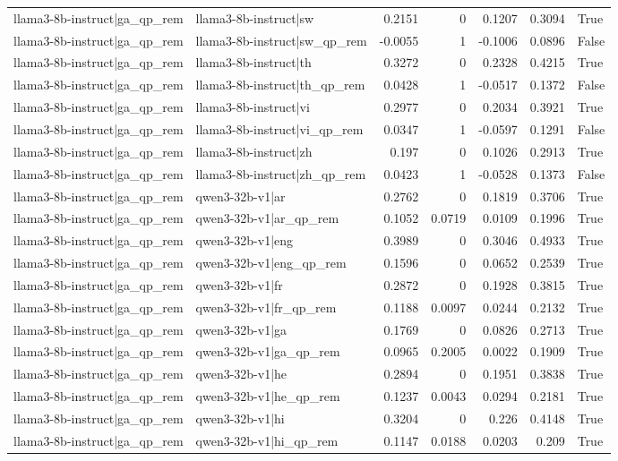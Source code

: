 \begin{table}
\begin{tabular}{l l r r r r l}
llama3-8b-instruct|ga_qp_rem & llama3-8b-instruct|sw & 0.2151 & 0 & 0.1207 & 0.3094 & True \\
llama3-8b-instruct|ga_qp_rem & llama3-8b-instruct|sw_qp_rem & -0.0055 & 1 & -0.1006 & 0.0896 & False \\
llama3-8b-instruct|ga_qp_rem & llama3-8b-instruct|th & 0.3272 & 0 & 0.2328 & 0.4215 & True \\
llama3-8b-instruct|ga_qp_rem & llama3-8b-instruct|th_qp_rem & 0.0428 & 1 & -0.0517 & 0.1372 & False \\
llama3-8b-instruct|ga_qp_rem & llama3-8b-instruct|vi & 0.2977 & 0 & 0.2034 & 0.3921 & True \\
llama3-8b-instruct|ga_qp_rem & llama3-8b-instruct|vi_qp_rem & 0.0347 & 1 & -0.0597 & 0.1291 & False \\
llama3-8b-instruct|ga_qp_rem & llama3-8b-instruct|zh & 0.197 & 0 & 0.1026 & 0.2913 & True \\
llama3-8b-instruct|ga_qp_rem & llama3-8b-instruct|zh_qp_rem & 0.0423 & 1 & -0.0528 & 0.1373 & False \\
llama3-8b-instruct|ga_qp_rem & qwen3-32b-v1|ar & 0.2762 & 0 & 0.1819 & 0.3706 & True \\
llama3-8b-instruct|ga_qp_rem & qwen3-32b-v1|ar_qp_rem & 0.1052 & 0.0719 & 0.0109 & 0.1996 & True \\
llama3-8b-instruct|ga_qp_rem & qwen3-32b-v1|eng & 0.3989 & 0 & 0.3046 & 0.4933 & True \\
llama3-8b-instruct|ga_qp_rem & qwen3-32b-v1|eng_qp_rem & 0.1596 & 0 & 0.0652 & 0.2539 & True \\
llama3-8b-instruct|ga_qp_rem & qwen3-32b-v1|fr & 0.2872 & 0 & 0.1928 & 0.3815 & True \\
llama3-8b-instruct|ga_qp_rem & qwen3-32b-v1|fr_qp_rem & 0.1188 & 0.0097 & 0.0244 & 0.2132 & True \\
llama3-8b-instruct|ga_qp_rem & qwen3-32b-v1|ga & 0.1769 & 0 & 0.0826 & 0.2713 & True \\
llama3-8b-instruct|ga_qp_rem & qwen3-32b-v1|ga_qp_rem & 0.0965 & 0.2005 & 0.0022 & 0.1909 & True \\
llama3-8b-instruct|ga_qp_rem & qwen3-32b-v1|he & 0.2894 & 0 & 0.1951 & 0.3838 & True \\
llama3-8b-instruct|ga_qp_rem & qwen3-32b-v1|he_qp_rem & 0.1237 & 0.0043 & 0.0294 & 0.2181 & True \\
llama3-8b-instruct|ga_qp_rem & qwen3-32b-v1|hi & 0.3204 & 0 & 0.226 & 0.4148 & True \\
llama3-8b-instruct|ga_qp_rem & qwen3-32b-v1|hi_qp_rem & 0.1147 & 0.0188 & 0.0203 & 0.209 & True \\

\end{tabular}
\end{table}
